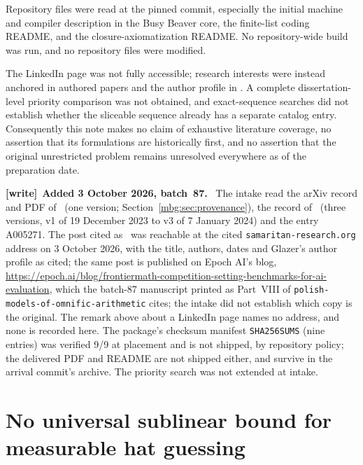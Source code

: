 \documentclass[11pt,letterpaper]{article}
\theoremstyle{definition}
\newenvironment{writenote}[1][]{\par\smallskip\begingroup\small
 \noindent\textbf{[write]}\if\relax\detokenize{#1}\relax\else~\textbf{#1.}\fi\ }%
 {\par\endgroup\smallskip}
\begin{document}
Repository files were read at the pinned commit, especially the initial machine and compiler description in the Busy Beaver core, the finite-list coding README, and the closure-axiomatization README. No repository-wide build was run, and no repository files were modified.

The LinkedIn page was not fully accessible; research interests were instead anchored in authored papers and the author profile in \cite{GlazerProfile}. A complete dissertation-level priority comparison was not obtained, and exact-sequence searches did not establish whether the sliceable sequence already has a separate catalog entry. Consequently this note makes no claim of exhaustive literature coverage, no assertion that its formulations are historically first, and no assertion that the original unrestricted problem remains unresolved everywhere as of the preparation date.

\begin{writenote}[Added 3 October 2026, batch~87]
The intake read the arXiv record and PDF of~\cite{GlazerBox} (one version; Section~\ref{mbg:sec:provenance}), the record of~\cite{GlazerChoice} (three versions, v1 of 19 December 2023 to v3 of 7 January 2024) and the entry A005271. The post cited as~\cite{GlazerProfile} was reachable at the cited \texttt{samaritan-research.org} address on 3 October 2026, with the title, authors, dates and Glazer's author profile as cited; the same post is published on Epoch AI's blog, \url{https://epoch.ai/blog/frontiermath-competition-setting-benchmarks-for-ai-evaluation}, which the batch-87 manuscript printed as Part~VIII of \nolinkurl{polish-models-of-omnific-arithmetic} cites; the intake did not establish which copy is the original. The remark above about a LinkedIn page names no address, and none is recorded here. The package's checksum manifest \texttt{SHA256SUMS} (nine entries) was verified 9/9 at placement and is not shipped, by repository policy; the delivered PDF and README are not shipped either, and survive in the arrival commit's archive. The priority search was not extended at intake.
\end{writenote}

\clearpage
{}
\part{No universal sublinear bound for measurable hat guessing}
\label{mbg:hat:part}
\end{document}
